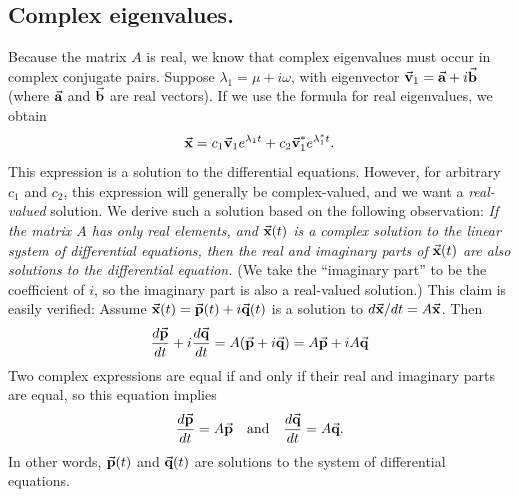 \subsection*{Complex eigenvalues.}
Because the matrix $A$ is real, we know that complex eigenvalues must
occur in complex conjugate pairs.
Suppose $\lambda_1 = \mu + i\omega$, with eigenvector
$\vec{\textbf{v}}_1=\vec{\textbf{a}}+i\vec{\textbf{b}}$ (where $\vec{\textbf{a}}$ and $\vec{\textbf{b}}$ are real vectors).
If we use the formula for real eigenvalues,
we obtain
\begin{equation}
 \vec{\textbf{x}} = c_1 \vec{\textbf{v}}_1 e^{\lambda_1 t} + c_2 \vec{\textbf{v}}_1^* e^{\lambda_1^* t}. 
\end{equation}
This expression is a solution to the differential equations.
However, for arbitrary $c_1$ and $c_2$, this expression will
generally be complex-valued, and we want a \emph{real-valued}
solution.
We derive such a solution based on the following observation:
\emph{If the matrix $A$ has only real elements, and} $\vec{\textbf{x}}(t)$
\emph{is a complex solution to the linear system of differential equations,
then the real and imaginary parts of} $\vec{\textbf{x}}(t)$
\emph{are also solutions
to the differential equation.}  (We take the ``imaginary part''
to be the coefficient of $i$, so the imaginary part is also
a real-valued solution.)  This claim is easily verified:
Assume $\vec{\textbf{x}}(t) = \vec{\textbf{p}}(t) + i \vec{\textbf{q}}(t)$ is a solution to
$d\vec{\textbf{x}}/dt = A\vec{\textbf{x}}$.  Then
\begin{equation}
  \frac{d\vec{\textbf{p}}}{dt} + i\frac{d\vec{\textbf{q}}}{dt} = A(\vec{\textbf{p}}+i\vec{\textbf{q}}) = A\vec{\textbf{p}} + iA\vec{\textbf{q}}
\end{equation}
Two complex expressions are equal if and only if their real
and imaginary parts are equal, so this equation implies
\begin{equation}
  \frac{d\vec{\textbf{p}}}{dt} = A\vec{\textbf{p}} \quad \textrm{and} \quad
  \frac{d\vec{\textbf{q}}}{dt} = A\vec{\textbf{q}}.
\end{equation}
In other words, $\vec{\textbf{p}}(t)$ and $\vec{\textbf{q}}(t)$ are solutions
to the system of differential equations.

